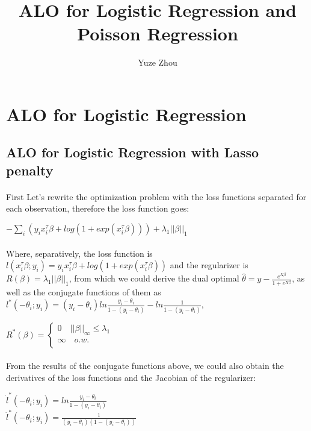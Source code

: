 \documentclass{article}
\title{ALO for Logistic Regression and Poisson Regression}
\author{Yuze Zhou}
\begin{document}
\section{ALO for Logistic Regression}
\subsection{ALO for Logistic Regression with Lasso penalty}
\paragraph{}First Let's rewrite the optimization problem with the loss functions separated for each observation, therefore the loss function goes:
\begin{center}
$-\sum\limits_{i}(y_{i}x_{i}^{\tau}\beta+log(1+exp(x_{i}^{\tau}\beta)))+\lambda_{1}||\beta||_{1}$
\end{center}
\paragraph{}Where, separatively, the loss function is $l(x_{i}^{\tau}\beta ;y_{i}) = y_{i}x_{i}^{\tau}\beta+log(1+exp(x_{i}^{\tau}\beta))$ and the regularizer is $R(\beta) = \lambda_{1}||\beta||_{1}$, from which we could derive the dual optimal $\hat{\theta} = y - \frac{e^{X\beta}}{1+e^{X\beta}}$, as well as the conjugate functions of them as $l^{*}(-\theta_{i};y_{i})=(y_{i}-\theta_{i})ln\frac{y_{i}-\theta_{i}}{1-(y_{i}-\theta_{i})}-ln\frac{1}{1-(y_{i}-\theta_{i})}$,
\begin{center}
$R^{*}(\beta) = \left\{
\begin{aligned}
0 \quad ||\beta||_{\infty} \leq \lambda_{1}\\
\infty \quad o.w.\\
\end{aligned}
\right.$
\end{center}
\paragraph{}From the results of the conjugate functions above, we could also obtain the derivatives of the loss functions and the Jacobian of the regularizer:
\begin{center}
$\dot{l}^{*}(-\theta_{i};y_{i}) = ln \frac{y_{i}-\theta_{i}}{1-(y_{i}-\theta_{i})}$\\
$\ddot{l}^{*}(-\theta_{i};y_{i}) = \frac{1}{(y_{i}-\theta_{i})(1-(y_{i}-\theta_{i}))}$
\end{center}
\end{document}
